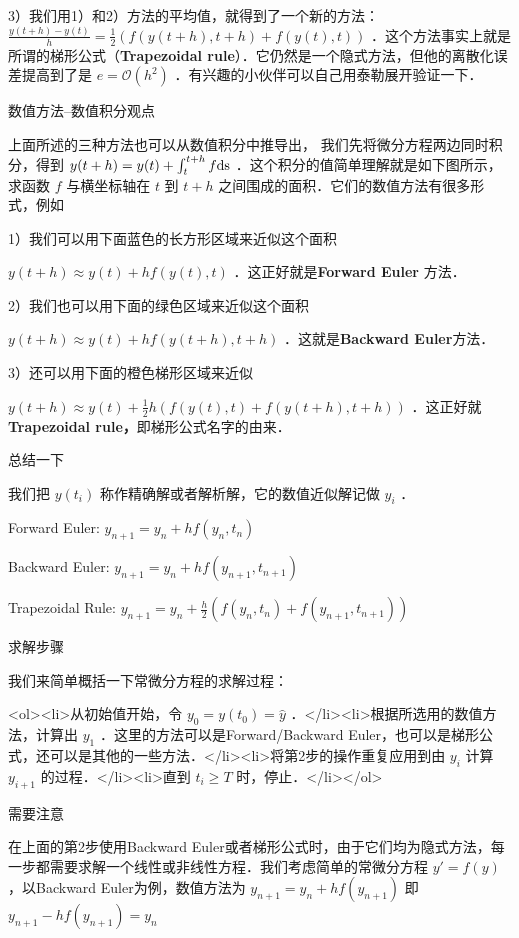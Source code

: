 3）我们用1）和2）方法的平均值，就得到了一个新的方法：  $ \frac{y(t+h)-y(t)}{h}= \frac{1}{2}\left(f(y(t+h),t+h)+f(y(t),t)\right)$  ．这个方法事实上就是所谓的梯形公式（\textbf{Trapezoidal rule}）．它仍然是一个隐式方法，但他的离散化误差提高到了是  $e=\mathcal{O}(h^2)$ ．有兴趣的小伙伴可以自己用泰勒展开验证一下．



数值方法--数值积分观点

上面所述的三种方法也可以从数值积分中推导出， 我们先将微分方程两边同时积分，得到  $y(t+h)=y(t)+\int_t^{t+h}f \rm{d}s$  ．这个积分的值简单理解就是如下图所示，求函数  $f$  与横坐标轴在  $t$  到  $t+h$  之间围成的面积．它们的数值方法有很多形式，例如

1）我们可以用下面蓝色的长方形区域来近似这个面积

$y(t+h)\approx y(t)+hf(y(t),t)$  ．这正好就是\textbf{Forward Euler }方法．

2）我们也可以用下面的绿色区域来近似这个面积

$y(t+h)\approx y(t)+hf(y(t+h),t+h)$  ．这就是\textbf{Backward Euler}方法．

3）还可以用下面的橙色梯形区域来近似

$y(t+h)\approx y(t)+\frac{1}{2}h\left(f(y(t),t)+f(y(t+h),t+h)\right)$  ．这正好就\textbf{Trapezoidal rule，}即梯形公式名字的由来．


总结一下

我们把  $y(t_i)$  称作精确解或者解析解，它的数值近似解记做  $y_i$ ．

Forward Euler:  $y_{n+1}=y_n+hf(y_n,t_n)$  

Backward Euler:  $y_{n+1}=y_n+hf(y_{n+1},t_{n+1})$  

Trapezoidal Rule:  $y_{n+1}=y_n+\frac{h}{2}\left(f(y_n,t_n)+f(y_{n+1},t_{n+1}) \right)$  



求解步骤

我们来简单概括一下常微分方程的求解过程：

<ol><li>从初始值开始，令  $y_0=y(t_0)=\hat{y}$  ．</li><li>根据所选用的数值方法，计算出  $y_1$  ．这里的方法可以是Forward/Backward Euler，也可以是梯形公式，还可以是其他的一些方法．</li><li>将第2步的操作重复应用到由  $y_i$  计算  $y_{i+1}$  的过程．</li><li>直到  $t_i\ge T$  时，停止．</li></ol>

需要注意

在上面的第2步使用Backward Euler或者梯形公式时，由于它们均为隐式方法，每一步都需要求解一个线性或非线性方程．我们考虑简单的常微分方程  $y'=f(y)$  ，以Backward Euler为例，数值方法为 $y_{n+1}=y_{n}+hf(y_{n+1})$  即  $y_{n+1}-hf(y_{n+1})=y_{n}$  

